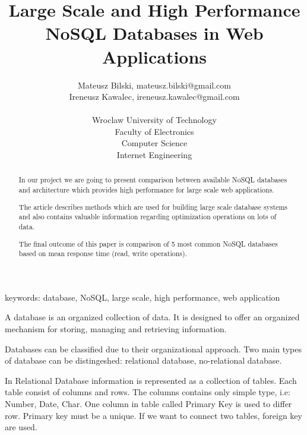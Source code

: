 \documentclass[times, 10pt,twocolumn]{article}
\begin{document}
  

\title{Large Scale and High Performance NoSQL Databases in Web Applications} 
\author{Mateusz Bilski, mateusz.bilski@gmail.com \\ Ireneusz Kawalec, ireneusz.kawalec@gmail.com \\ \\
Wroclaw University of Technology\\ Faculty of Electronics \\ Computer Science \\ Internet Engineering  \\  
} 

\maketitle
\thispagestyle{empty} 

\begin{abstract}   

In our project we are going to present comparison between available NoSQL
databases and architecture which provides high performance for large scale web applications.

The article describes methods which are used for building large scale database
systems and also contains valuable information regarding optimization operations
on lots of data.

The final outcome of this paper is comparison of 5 most common NoSQL
databases based on mean response time (read, write operations).

\end{abstract} 

keywords: database, NoSQL, large scale, high performance, web application



A database is an organized collection of data. It is designed to offer an organized mechanism for storing, 
managing and retrieving information.

Databases can be classified due to their organizational approach. Two main
types of database can be distingeshed: relational database, no-relational
database.

In Relational Database information is represented as a collection of tables. 
Each table consist of columns and rows. The columns contains only simple
type, i.e: Number, Date, Char. One column in table called Primary Key
is used to differ row. Primary key must be a unique. If we want to connect 
two tables, foreign key are used.
\end{document}
